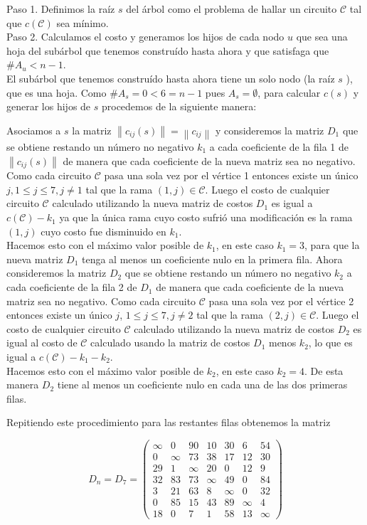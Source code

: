 \documentclass[10pt]{article}
\begin{document}
Paso 1. Definimos la raíz $s$ del árbol como el problema de hallar un circuito $\mathcal{C}$ tal que $c(\mathcal{C})$ sea mínimo.\\
Paso 2. Calculamos el costo y generamos los hijos de cada nodo $u$ que sea una hoja del subárbol que tenemos construído hasta ahora y que satisfaga que $\# A_{u}<n-1$.\\
El subárbol que tenemos construído hasta ahora tiene un solo nodo (la raíz $s$ ), que es una hoja. Como $\# A_{s}=0<6=n-1$ pues $A_{s}=\emptyset$, para calcular $c(s)$ y generar los hijos de $s$ procedemos de la siguiente manera:

Asociamos a $s$ la matriz $\left\|c_{i j}(s)\right\|=\left\|c_{i j}\right\|$ y consideremos la matriz $D_{1}$ que se obtiene restando un número no negativo $k_{1}$ a cada coeficiente de la fila 1 de $\left\|c_{i j}(s)\right\|$ de manera que cada coeficiente de la nueva matriz sea no negativo. Como cada circuito $\mathcal{C}$ pasa una sola vez por el vértice 1 entonces existe un único $j, 1 \leq j \leq 7, j \neq 1$ tal que la rama $(1, j) \in \mathcal{C}$. Luego el costo de cualquier circuito $\mathcal{C}$ calculado utilizando la nueva matriz de costos $D_{1}$ es igual a $c(\mathcal{C})-k_{1}$ ya que la única rama cuyo costo sufrió una modificación es la rama $(1, j)$ cuyo costo fue disminuido en $k_{1}$.\\
Hacemos esto con el máximo valor posible de $k_{1}$, en este caso $k_{1}=3$, para que la nueva matriz $D_{1}$ tenga al menos un coeficiente nulo en la primera fila. Ahora consideremos la matriz $D_{2}$ que se obtiene restando un número no negativo $k_{2}$ a cada coeficiente de la fila 2 de $D_{1}$ de manera que cada coeficiente de la nueva matriz sea no negativo. Como cada circuito $\mathcal{C}$ pasa una sola vez por el vértice 2 entonces existe un único $j$, $1 \leq j \leq 7, j \neq 2$ tal que la rama $(2, j) \in \mathcal{C}$. Luego el costo de cualquier circuito $\mathcal{C}$ calculado utilizando la nueva matriz de costos $D_{2}$ es igual al costo de $\mathcal{C}$ calculado usando la matriz de costos $D_{1}$ menos $k_{2}$, lo que es igual a $c(\mathcal{C})-k_{1}-k_{2}$.\\
Hacemos esto con el máximo valor posible de $k_{2}$, en este caso $k_{2}=4$. De esta manera $D_{2}$ tiene al menos un coeficiente nulo en cada una de las dos primeras filas.

Repitiendo este procedimiento para las restantes filas obtenemos la matriz

$$
D_{n}=D_{7}=\left(\begin{array}{ccccccc}
\infty & 0 & 90 & 10 & 30 & 6 & 54 \\
0 & \infty & 73 & 38 & 17 & 12 & 30 \\
29 & 1 & \infty & 20 & 0 & 12 & 9 \\
32 & 83 & 73 & \infty & 49 & 0 & 84 \\
3 & 21 & 63 & 8 & \infty & 0 & 32 \\
0 & 85 & 15 & 43 & 89 & \infty & 4 \\
18 & 0 & 7 & 1 & 58 & 13 & \infty
\end{array}\right)
$$
\end{document}
